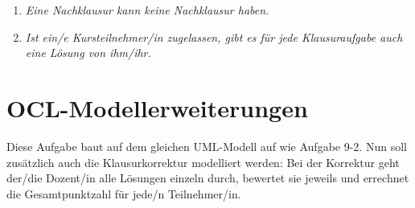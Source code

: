 \begin{enumerate}[(a)]
\begin{enumerate}
        \item {\itshape Eine Nachklausur kann keine Nachklausur haben.}
        
        
        \item {\itshape Ist ein/e Kursteilnehmer/in zugelassen, gibt es für jede Klausuraufgabe auch eine Lösung von ihm/ihr.}
        

    \end{enumerate}

\end{enumerate}



\section{OCL-Modellerweiterungen}
Diese Aufgabe baut auf dem gleichen UML-Modell auf wie Aufgabe 9-2. Nun soll zusätzlich auch die Klausurkorrektur modelliert werden: Bei der Korrektur geht der/die Dozent/in alle Lösungen einzeln durch, bewertet sie jeweils und errechnet die Gesamtpunktzahl für jede/n Teilnehmer/in.

